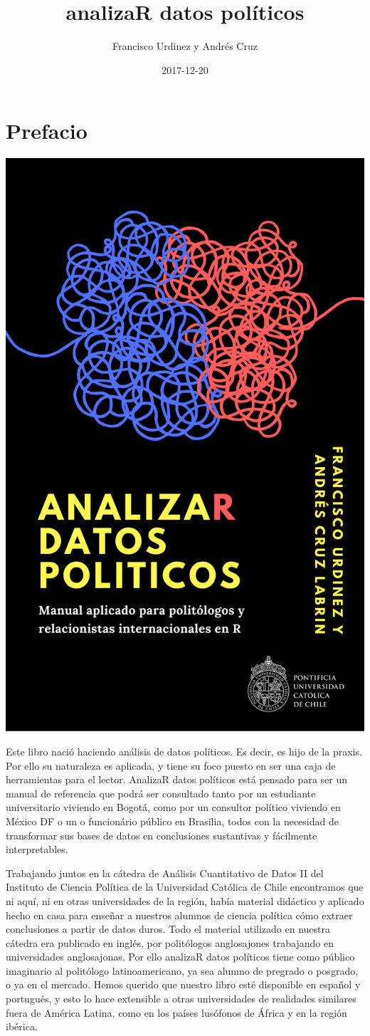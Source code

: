 \documentclass[]{book}
\title{analizaR datos políticos}
\author{Francisco Urdinez y Andrés Cruz}
\date{2017-12-20}
\begin{document}
\maketitle

{
\setcounter{tocdepth}{1}
\tableofcontents
}
\chapter{Prefacio}\label{prefacio}

\includegraphics[width=0.6\linewidth]{images/tapa}

Este libro nació haciendo análisis de datos políticos. Es decir, es hijo
de la praxis. Por ello su naturaleza es aplicada, y tiene su foco puesto
en ser una caja de herramientas para el lector. AnalizaR datos políticos
está pensado para ser un manual de referencia que podrá ser consultado
tanto por un estudiante universitario viviendo en Bogotá, como por un
consultor político viviendo en México DF o un o funcionário público en
Brasilia, todos con la necesidad de transformar sus bases de datos en
conclusiones sustantivas y fácilmente interpretables.

Trabajando juntos en la cátedra de Análisis Cuantitativo de Datos II del
Instituto de Ciencia Política de la Universidad Católica de Chile
encontramos que ni aquí, ni en otras universidades de la región, había
material didáctico y aplicado hecho en casa para enseñar a nuestros
alumnos de ciencia política cómo extraer conclusiones a partir de datos
duros. Todo el material utilizado en nuestra cátedra era publicado en
inglés, por politólogos anglosajones trabajando en universidades
anglosajonas. Por ello analizaR datos políticos tiene como público
imaginario al politólogo latinoamericano, ya sea alumno de pregrado o
posgrado, o ya en el mercado. Hemos querido que nuestro libro esté
disponible en español y portugués, y esto lo hace extensible a otras
universidades de realidades similares fuera de América Latina, como en
los países lusófonos de África y en la región ibérica.
\end{document}
